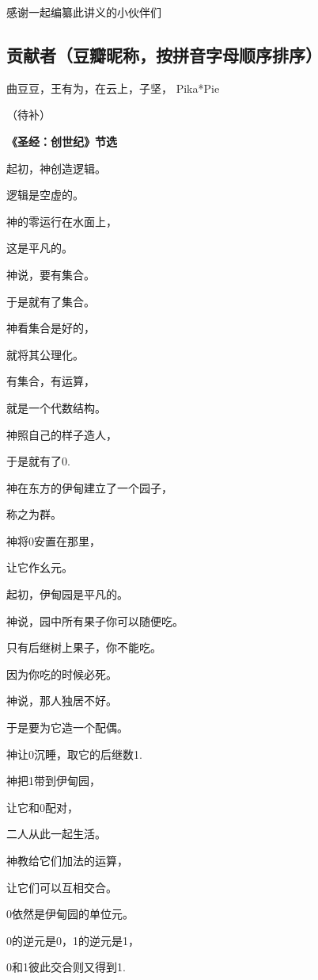 感谢一起编纂此讲义的小伙伴们
\vspp

\subsection*{贡献者（豆瓣昵称，按拼音字母顺序排序）}

曲豆豆，王有为，在云上，子坚，
Pika*Pie

（待补）

\newpage

\begin{centering}
\begin{Huge}
\textbf{《圣经：创世纪》节选}
\end{Huge}\vsp
\large

起初，神创造逻辑。

逻辑是空虚的。

神的零运行在水面上，

这是平凡的。

神说，要有集合。

于是就有了集合。

神看集合是好的，

就将其公理化。

有集合，有运算，

就是一个代数结构。\vsp

神照自己的样子造人，

于是就有了0.

神在东方的伊甸建立了一个园子，

称之为群。

神将0安置在那里，

让它作幺元。

起初，伊甸园是平凡的。

神说，园中所有果子你可以随便吃。

只有后继树上果子，你不能吃。

因为你吃的时候必死。\vsp

神说，那人独居不好。

于是要为它造一个配偶。

神让0沉睡，取它的后继数1.

神把1带到伊甸园，

让它和0配对，

二人从此一起生活。

神教给它们加法的运算，

让它们可以互相交合。

0依然是伊甸园的单位元。

0的逆元是0，1的逆元是1，

0和1彼此交合则又得到1.\vsp


\end{centering}
